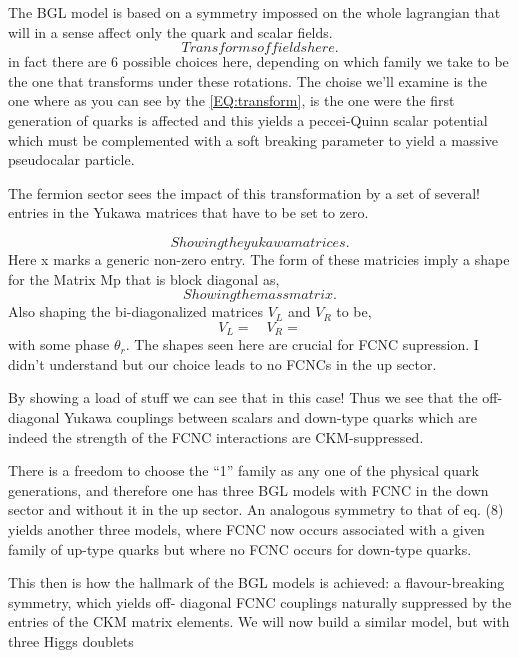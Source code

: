 The BGL model is based on a symmetry impossed on the whole lagrangian that will in a sense affect only the quark and scalar fields. 
\begin{equation}
\label{EQ:transform}
Transforms of fields here. 
\end{equation}
in fact there are 6 possible choices here, depending on which family we take to be the one that transforms under these rotations.  The choise we'll examine is the one where as you can see by the \ref{EQ:transform}, is the one were the first generation of quarks is affected and this yields a peccei-Quinn scalar potential which must be complemented with a soft breaking parameter to yield a massive pseudocalar particle. 

The fermion sector sees the impact of this transformation by a set of several! entries in the Yukawa matrices that have to be set to zero. 

\begin{equation}
Showing the yukawa matrices.
\end{equation} 
Here x marks a generic non-zero entry. The form of these matricies imply a shape for the Matrix Mp that is block diagonal as,
\begin{equation}
Showing the mass matrix. 
\end{equation}
Also shaping the bi-diagonalized matrices $V_L$ and $V_R$ to be,
\begin{equation}
V_L = \quad V_R = 
\end{equation}
with some phase $\theta_r$. The shapes seen here are crucial for FCNC supression. I didn't understand but our choice leads to no FCNCs in the up sector.  


By showing a load of stuff we can see that in this case! Thus we see that the off-diagonal Yukawa couplings between scalars and down-type quarks which are indeed the strength of the FCNC interactions are CKM-suppressed. 

There is a freedom to choose the “1” family as
any one of the physical quark generations, and therefore one has three BGL models with FCNC in the down
sector and without it in the up sector. An analogous symmetry to that of eq. (8) yields another three models,
where FCNC now occurs associated with a given family of up-type quarks but where no FCNC occurs for
down-type quarks.

This then is how the hallmark of the BGL models is achieved: a flavour-breaking symmetry, which yields off-
diagonal FCNC couplings naturally suppressed by the entries of the CKM matrix elements. We will now build
a similar model, but with three Higgs doublets


